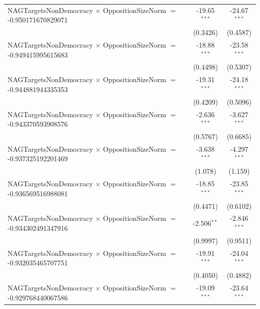 \begin{tabular}{lcc}
   NAGTargetsNonDemocracy $\times$ OppositionSizeNorm $=$ -0.950171670829071    & -19.65$^{***}$       & -24.67$^{***}$\\   
                                                                                & (0.3426)             & (0.4587)\\   
   NAGTargetsNonDemocracy $\times$ OppositionSizeNorm $=$ -0.949415995615683    & -18.88$^{***}$       & -23.58$^{***}$\\   
                                                                                & (0.4498)             & (0.5307)\\   
   NAGTargetsNonDemocracy $\times$ OppositionSizeNorm $=$ -0.944881944335353    & -19.31$^{***}$       & -24.18$^{***}$\\   
                                                                                & (0.4209)             & (0.5096)\\   
   NAGTargetsNonDemocracy $\times$ OppositionSizeNorm $=$ -0.943370593908576    & -2.636$^{***}$       & -3.627$^{***}$\\   
                                                                                & (0.5767)             & (0.6685)\\   
   NAGTargetsNonDemocracy $\times$ OppositionSizeNorm $=$ -0.937325192201469    & -3.638$^{***}$       & -4.297$^{***}$\\   
                                                                                & (1.078)              & (1.159)\\   
   NAGTargetsNonDemocracy $\times$ OppositionSizeNorm $=$ -0.936569516988081    & -18.85$^{***}$       & -23.85$^{***}$\\   
                                                                                & (0.4471)             & (0.6102)\\   
   NAGTargetsNonDemocracy $\times$ OppositionSizeNorm $=$ -0.934302491347916    & -2.506$^{**}$        & -2.846$^{***}$\\   
                                                                                & (0.9997)             & (0.9511)\\   
   NAGTargetsNonDemocracy $\times$ OppositionSizeNorm $=$ -0.932035465707751    & -19.91$^{***}$       & -24.04$^{***}$\\   
                                                                                & (0.4050)             & (0.4882)\\   
   NAGTargetsNonDemocracy $\times$ OppositionSizeNorm $=$ -0.929768440067586    & -19.09$^{***}$       & -23.64$^{***}$\\   

\end{tabular}
